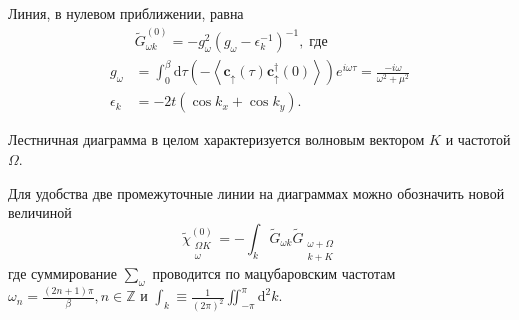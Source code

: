 \documentclass[11pt,a4paper]{report}
\begin{document}
\begin{figure}[H]
\centering
{}
\caption{}
\label{operators}
\end{figure}

Линия, в нулевом приближении, равна
\begin{equation}
\begin{split}
&\tilde{G}^{(0)}_{\omega k} = - g^2_\omega(g_\omega-\epsilon^{-1}_k)^{-1},\;\text{где} \\
g_\omega &= \int_0^\beta \mathrm{d}\tau \left(-\left< \mathbf{c}_\uparrow(\tau)\mathbf{c}^\dag_\uparrow(0) \right>\right) e^{i\omega\tau} = \frac{-i\omega}{\omega^2+\mu^2} \\
\epsilon_k &= - 2 t (\cos k_x+\cos k_y).
\end{split}
\end{equation}

Лестничная диаграмма в целом характеризуется волновым вектором $K$ и частотой $\Omega$.

Для удобства две промежуточные линии на диаграммах можно обозначить новой величиной
\begin{equation}
\tilde{\chi}^{(0)}_{\substack{\Omega K\\\omega}} = -\int_k  \tilde{G}_{\omega k} \tilde{G}_{\substack{\omega+\Omega\\k+K}} 
\end{equation}
где суммирование $\sum_\omega$ проводится по мацубаровским частотам $\omega_n = \frac{(2n+1)\pi}{\beta}, n\in\mathbb{Z}$ и $\int_k \equiv \frac{1}{(2\pi)^2}\iint_{-\pi}^{\pi} \mathrm{d}^2k$.
\end{document}

